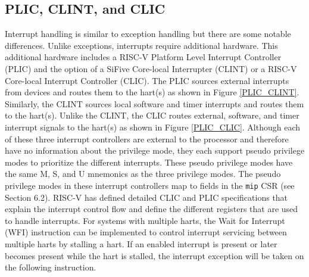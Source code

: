 \documentclass[12pt]{article}
\begin{document}
\subsection{PLIC, CLINT, and CLIC}
Interrupt handling is similar to exception handling but there are some notable differences. Unlike exceptions, interrupts require additional hardware. This additional hardware includes a RISC-V Platform Level Interrupt Controller (PLIC)\cite{PLIC} and the option of a SiFive Core-local Interrupter (CLINT)\cite{CLINT} or a RISC-V Core-local Interrupt Controller (CLIC)\cite{CLIC}. The PLIC sources external interrupts from devices and routes them to the hart(s) as shown in Figure \ref{PLIC_CLINT}. Similarly, the CLINT sources local software and timer interrupts and routes them to the hart(s). Unlike the CLINT, the CLIC routes external, software, and timer interrupt signals to the hart(s) as shown in Figure \ref{PLIC_CLIC}. Although each of these three interrupt controllers are external to the processor and therefore have no information about the privilege mode, they each support pseudo privilege modes to prioritize the different interrupts. These pseudo privilege modes have the same M, S, and U mnemonics as the three privilege modes. The pseudo privilege modes in these interrupt controllers map to fields in the {\tt{mip}} CSR (see Section 6.2). RISC-V has defined detailed CLIC and PLIC specifications that explain the interrupt control flow and define the different registers that are used to handle interrupts. For systems with multiple harts, the Wait for Interrupt (WFI) instruction can be implemented to control interrupt servicing between multiple harts by stalling a hart. If an enabled interrupt is present or later becomes present while the hart is stalled, the interrupt exception will be taken on the following instruction.
\end{document}

